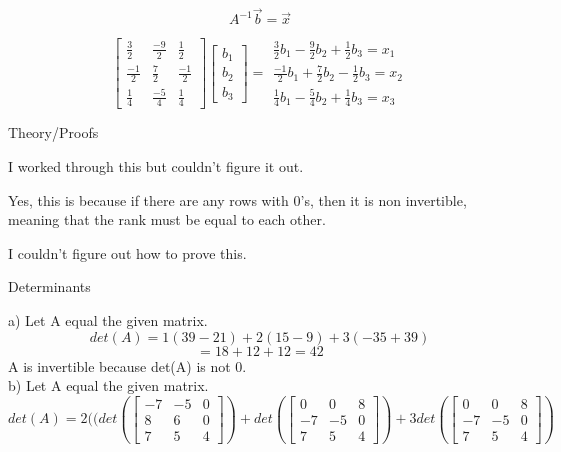 \documentclass[12pt]{article}
\newcommand{\sqbrl}{\left[}
\newcommand{\sqbrr}{\right]}
\newenvironment{problem}[2][Problem]{\begin{trivlist}
\item[\hskip \labelsep {\bfseries #1}\hskip \labelsep {\bfseries #2.}]}{\end{trivlist}}
\begin{document}
\[A^{-1}\vec{b} = \vec{x}\]

\[\sqbrl\begin{matrix}\frac{3}{2} & \frac{-9}{2} & \frac{1}{2}\\\frac{-1}{2} & \frac{7}{2} & \frac{-1}{2}\\ \frac{1}{4} &\frac{-5}{4} & \frac{1}{4}\end{matrix}\sqbrr\sqbrl\begin{matrix}b_1\\b_2\\b_3\end{matrix}\sqbrr = \begin{matrix}\frac{3}{2}b_1 - \frac{9}{2}b_2 + \frac{1}{2}b_3 = x_1\\
\frac{-1}{2}b_1 + \frac{7}{2}b_2 - \frac{1}{2}b_3 = x_2\\
\frac{1}{4}b_1 - \frac{5}{4}b_2 + \frac{1}{4}b_3 = x_3\end{matrix}\]


\begin{problem}{3}
	Theory/Proofs
\end{problem}
I worked through this but couldn't figure it out.\\
\begin{problem}{4}
\end{problem}
Yes, this is because if there are any rows with 0's, then it is non invertible, meaning that the rank must be equal to each other.\\

\begin{problem}{5}
\end{problem}
I couldn't figure out how to prove this.\\

\begin{problem}{6}
	Determinants
\end{problem}
a) Let A equal the given matrix.\\
\[det(A) = 1(39 - 21) + 2(15-9) + 3(-35 + 39)\]
\[= 18 + 12 + 12 = 42\]
A is invertible because det(A) is not 0.\\

b) Let A equal the given matrix.\\
\[det(A) = 2((det\left(\sqbrl\begin{matrix}-7 & -5 & 0\\8 & 6 & 0\\ 7 & 5 & 4\end{matrix}\sqbrr\right)
			+ det\left(\sqbrl\begin{matrix} 0 & 0 & 8\\-7&-5&0\\7&5&4\end{matrix}\sqbrr\right)
			+ 3det\left(\sqbrl\begin{matrix}0 & 0 & 8\\-7 & -5 & 0\\7&5&4\end{matrix}\sqbrr\right)\]
\end{document}
